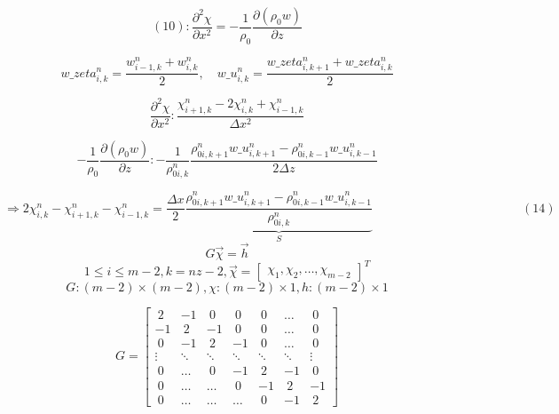 \documentclass[a4paper,fleqn,10pt]{report}
\begin{document}
\begin{CJK*}{UTF8}{bsmi}
\newpage
\begin{equation*}
(10): \frac{\partial^2 \chi}{\partial x^2} = -\frac{1}{\rho_{0}}\frac{\partial (\rho_{0}w)}{\partial z}
\end{equation*}

\begin{equation*}
w\_zeta^{n}_{i,k} = \frac{w^{n}_{i-1,k} + w^{n}_{i,k}}{2}, \quad w\_u^{n}_{i,k} = \frac{w\_zeta^{n}_{i,k+1} + w\_zeta^{n}_{i,k}}{2}
\end{equation*}

\begin{equation*}
\frac{\partial^2 \chi}{\partial x^{2}}: \frac{\chi^{n}_{i+1,k} - 2\chi^{n}_{i,k} + \chi^{n}_{i-1,k}}{\Delta x^{2}}
\end{equation*}

\begin{equation*}
-\frac{1}{\rho_{0}}\frac{\partial (\rho_{0}w)}{\partial z}: -\frac{1}{\rho^{n}_{0i,k}}\frac{\rho^{n}_{0i,k+1}w\_u^{n}_{i,k+1} - \rho^{n}_{0i,k-1}w\_u^{n}_{i,k-1}}{2\Delta z}
\end{equation*}

\begin{equation*}
\Rightarrow 2\chi^{n}_{i,k} - \chi^{n}_{i+1,k} - \chi^{n}_{i-1,k} = \frac{\Delta x}{2}\underbrace{\frac{\rho^{n}_{0i,k+1}w\_u^{n}_{i,k+1} - \rho^{n}_{0i,k-1}w\_u^{n}_{i,k-1}}{\rho^{n}_{0i,k}}}_{S}\qquad \qquad \qquad \qquad \qquad \qquad(14)
\end{equation*}
\begin{equation*}
G\vec{\chi} = \vec{h}
\end{equation*}
\begin{equation*}
1 \leq i \leq m-2, k = nz-2, \vec{\chi} = 
\begin{bmatrix} 
	\chi_{1} , \chi_{2} , \ldots , \chi_{m-2}
\end{bmatrix}^T
\end{equation*}
\begin{equation*}
G: (m-2) \times (m-2), \chi: (m-2) \times 1, h: (m-2) \times 1
\end{equation*}

\begin{equation*}
G = 
\begin{bmatrix}
	~2 & -1 & ~0 & ~0 & ~0 & \ldots & ~0 \\
        -1 & ~2 & -1 & ~0 & ~0 & \ldots & ~0 \\
        ~0 & -1 & ~2 & -1 & ~0 & \ldots & ~0 \\
        \vdots & \ddots & \ddots & \ddots & \ddots & \ddots & \vdots \\
        ~0 & \ldots & ~0 & -1 & ~2 & -1 & ~0 \\
        ~0 & \ldots & \ldots & ~0 & -1 & ~2 & -1 \\
        ~0 & \ldots & \ldots & \ldots & ~0 & -1 & ~2


\end{bmatrix}
\end{equation*}
\end{CJK*}
\end{document}
